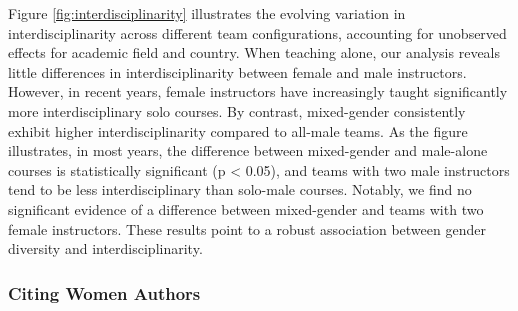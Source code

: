 \documentclass[
  11pt, %
]{article}
\begin{document}
Figure \ref{fig:interdisciplinarity} illustrates the evolving variation in interdisciplinarity across different team configurations, accounting for unobserved effects for academic field and country. When teaching alone, our analysis reveals little differences in interdisciplinarity between female and male instructors. However, in recent years, female instructors have increasingly taught significantly more interdisciplinary solo courses. By contrast, mixed-gender consistently exhibit higher interdisciplinarity compared to all-male teams. As the figure illustrates, in most years, the difference between mixed-gender and male-alone courses is statistically significant (p \textless{} 0.05), and teams with two male instructors tend to be less interdisciplinary than solo-male courses. Notably, we find no significant evidence of a difference between mixed-gender and teams with two female instructors. These results point to a robust association between gender diversity and interdisciplinarity.

\subsubsection{Citing Women Authors}\label{citing-women-authors}
\end{document}
